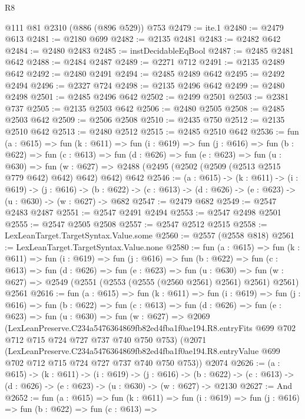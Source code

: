 \begin{lexlean}{R8}
\begin{coremodule}
    @111
    @81
    @2310
    (@886 (@896 @529))
    @753
@2479 := ite.{1}
@2480 := @2479 @613
@2481 := @2180 @699
@2482 := @2135 @2481
@2483 := @2482 @642
@2484 := @2480 @2483
@2485 := instDecidableEqBool
@2487 := @2485 @2481 @642
@2488 := @2484 @2487
@2489 := @2271 @712
@2491 := @2135 @2489 @642
@2492 := @2480 @2491
@2494 := @2485 @2489 @642
@2495 := @2492 @2494
@2496 := @2327 @724
@2498 := @2135 @2496 @642
@2499 := @2480 @2498
@2501 := @2485 @2496 @642
@2502 := @2499 @2501
@2503 := @2381 @737
@2505 := @2135 @2503 @642
@2506 := @2480 @2505
@2508 := @2485 @2503 @642
@2509 := @2506 @2508
@2510 := @2435 @750
@2512 := @2135 @2510 @642
@2513 := @2480 @2512
@2515 := @2485 @2510 @642
@2536 := fun (a : @615) =>
  fun (k : @611) =>
  fun (i : @619) =>
  fun (j : @616) =>
  fun (b : @622) =>
  fun (c : @613) =>
  fun (d : @626) =>
  fun (e : @623) =>
  fun (u : @630) =>
  fun (w : @627) => @2488 (@2495 (@2502 (@2509 (@2513 @2515 @779 @642) @642) @642) @642) @642
@2546 := (a : @615) ->
  (k : @611) ->
  (i : @619) ->
  (j : @616) ->
  (b : @622) -> (c : @613) -> (d : @626) -> (e : @623) -> (u : @630) -> (w : @627) -> @682
@2547 := @2479 @682
@2549 := @2547 @2483 @2487
@2551 := @2547 @2491 @2494
@2553 := @2547 @2498 @2501
@2555 := @2547 @2505 @2508
@2557 := @2547 @2512 @2515
@2558 := LexLeanTarget.TargetSyntax.Value.some
@2560 := @2557 (@2558 @818)
@2561 := LexLeanTarget.TargetSyntax.Value.none
@2580 := fun (a : @615) =>
  fun (k : @611) =>
  fun (i : @619) =>
  fun (j : @616) =>
  fun (b : @622) =>
  fun (c : @613) =>
  fun (d : @626) =>
  fun (e : @623) =>
  fun (u : @630) =>
  fun (w : @627) => @2549 (@2551 (@2553 (@2555 (@2560 @2561) @2561) @2561) @2561) @2561
@2616 := fun (a : @615) =>
  fun (k : @611) =>
  fun (i : @619) =>
  fun (j : @616) =>
  fun (b : @622) =>
  fun (c : @613) =>
  fun (d : @626) =>
  fun (e : @623) =>
  fun (u : @630) =>
  fun (w : @627) =>
  @2069
    (LexLeanPreserve.C234a5476364869fb82ed4fba1f0ae194.R8.entryFits
      @699
      @702
      @712
      @715
      @724
      @727
      @737
      @740
      @750
      @753)
    (@2071
      (LexLeanPreserve.C234a5476364869fb82ed4fba1f0ae194.R8.entryValue
        @699
        @702
        @712
        @715
        @724
        @727
        @737
        @740
        @750
        @753))
    @2074
@2626 := (a : @615) ->
  (k : @611) ->
  (i : @619) ->
  (j : @616) ->
  (b : @622) -> (c : @613) -> (d : @626) -> (e : @623) -> (u : @630) -> (w : @627) -> @2130
@2627 := And
@2652 := fun (a : @615) =>
  fun (k : @611) =>
  fun (i : @619) =>
  fun (j : @616) =>
  fun (b : @622) =>
  fun (c : @613) =>

\end{coremodule}
\end{lexlean}
